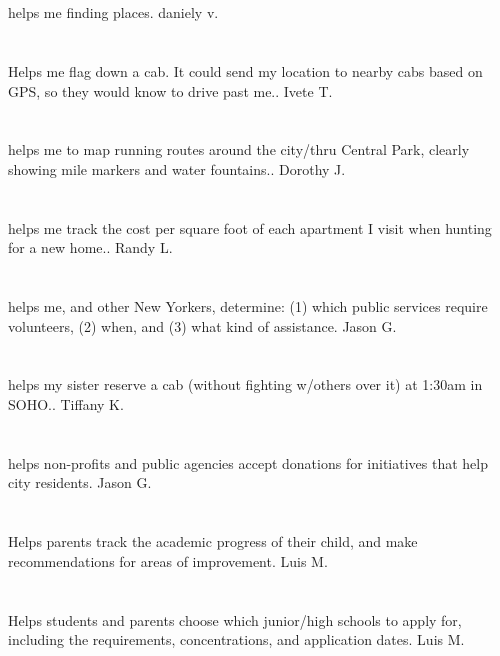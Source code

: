 \section{}helps me finding places. daniely v.
\section{}Helps me flag down a cab. It could send my location to nearby cabs based on GPS,  so they would know to drive past me.. Ivete T.
\section{}helps me to map running routes around the city/thru Central Park,  clearly showing mile markers and water fountains.. Dorothy J.
\section{}helps me track the cost per square foot of each apartment I visit when hunting for a new home.. Randy L.
\section{}helps me,  and other New Yorkers,  determine: (1) which public services require volunteers,  (2) when,  and (3) what kind of assistance. Jason G.
\section{}helps my sister reserve a cab (without fighting w/others over it) at 1:30am in SOHO.. Tiffany K.
\section{}helps non-profits and public agencies accept donations for initiatives that help city residents. Jason G.
\section{}Helps parents track the academic progress of their child,  and make recommendations for areas of improvement. Luis M.
\section{}Helps students and parents choose which junior/high schools to apply for,  including the requirements,  concentrations,  and application dates. Luis M.
